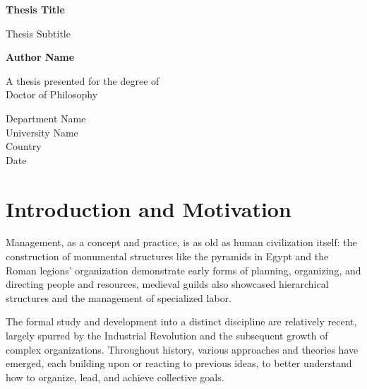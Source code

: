 \documentclass{article}
\begin{document}
\begin{titlepage}
   \begin{center}
       \vspace*{1cm}

       \textbf{Thesis Title}

       \vspace{0.5cm}
        Thesis Subtitle
            
       \vspace{1.5cm}

       \textbf{Author Name}

       \vfill
            
       A thesis presented for the degree of\\
       Doctor of Philosophy
            
       \vspace{0.8cm}
     
       
            
       Department Name\\
       University Name\\
       Country\\
       Date
            
   \end{center}
\end{titlepage}
\tableofcontents

\newpage
\section{Introduction and Motivation}
Management, as a concept and practice, is as old as human civilization itself: the construction of monumental structures like the pyramids in Egypt and the Roman legions' organization demonstrate early forms of planning, organizing, and directing people and resources, medieval guilds also showcased hierarchical structures and the management of specialized labor.

The formal study and development into a distinct discipline are relatively recent, largely spurred by the Industrial Revolution and the subsequent growth of complex organizations. Throughout history, various approaches and theories have emerged, each building upon or reacting to previous ideas, to better understand how to organize, lead, and achieve collective goals.
\end{document}

